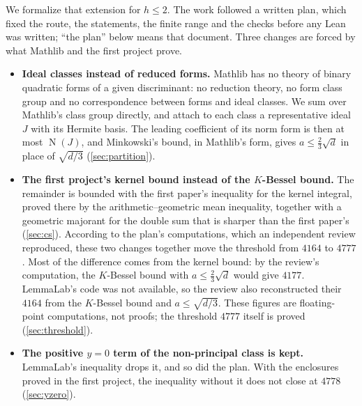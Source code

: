 \documentclass[11pt]{article}
\theoremstyle{definition}
\newcommand{\Nm}{\operatorname{N}}
\begin{document}
We formalize that extension for $h \le 2$. The work followed a written plan, which fixed the route, the statements, the finite range and the checks before any Lean was written; ``the plan'' below means that document. Three changes are forced by what Mathlib and the first project prove.
\begin{itemize}[nosep]
\item \textbf{Ideal classes instead of reduced forms.} Mathlib has no theory of binary quadratic forms of a given discriminant: no reduction theory, no form class group and no correspondence between forms and ideal classes. We sum over Mathlib's class group directly, and attach to each class a representative ideal $J$ with its Hermite basis. The leading coefficient of its norm form is then at most $\Nm(J)$, and Minkowski's bound, in Mathlib's form, gives $a \le \frac23\sqrt d$ in place of $\sqrt{d/3}$ (\cref{sec:partition}).
\item \textbf{The first project's kernel bound instead of the $K$-Bessel bound.} The remainder is bounded with the first paper's inequality for the kernel integral, proved there by the arithmetic--geometric mean inequality, together with a geometric majorant for the double sum that is sharper than the first paper's (\cref{sec:cs}). According to the plan's computations, which an independent review reproduced, these two changes together move the threshold from $4164$ to $4777$. Most of the difference comes from the kernel bound: by the review's computation, the $K$-Bessel bound with $a \le \frac23\sqrt d$ would give $4177$. LemmaLab's code was not available, so the review also reconstructed their $4164$ from the $K$-Bessel bound and $a \le \sqrt{d/3}$. These figures are floating-point computations, not proofs; the threshold $4777$ itself is proved (\cref{sec:threshold}).
\item \textbf{The positive $y = 0$ term of the non-principal class is kept.} LemmaLab's inequality drops it, and so did the plan. With the enclosures proved in the first project, the inequality without it does not close at $4778$ (\cref{sec:yzero}).
\end{itemize}
\end{document}
